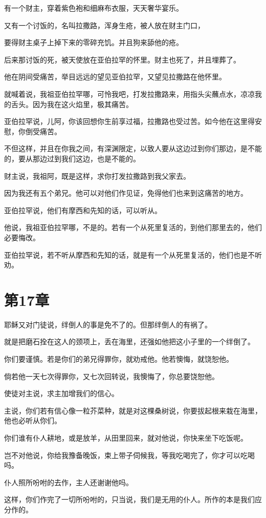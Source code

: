 \documentclass[12pt,oneside]{book}
\begin{document}
有一个财主，穿着紫色袍和细麻布衣服，天天奢华宴乐。

又有一个讨饭的，名叫拉撒路，浑身生疮，被人放在财主门口，

要得财主桌子上掉下来的零碎充饥。并且狗来舔他的疮。

后来那讨饭的死，被天使放在亚伯拉罕的怀里。财主也死了，并且埋葬了。

他在阴间受痛苦，举目远远的望见亚伯拉罕，又望见拉撒路在他怀里。

就喊着说，我祖亚伯拉罕哪，可怜我吧，打发拉撒路来，用指头尖蘸点水，凉凉我的舌头。因为我在这火焰里，极其痛苦。

亚伯拉罕说，儿阿，你该回想你生前享过福，拉撒路也受过苦。如今他在这里得安慰，你倒受痛苦。

不但这样，并且在你我之间，有深渊限定，以致人要从这边过到你们那边，是不能的，要从那边过到我们这边，也是不能的。

财主说，我祖阿，既是这样，求你打发拉撒路到我父家去。

因为我还有五个弟兄。他可以对他们作见证，免得他们也来到这痛苦的地方。

亚伯拉罕说，他们有摩西和先知的话，可以听从。

他说，我祖亚伯拉罕哪，不是的。若有一个从死里复活的，到他们那里去的，他们必要悔改。

亚伯拉罕说，若不听从摩西和先知的话，就是有一个从死里复活的，他们也是不听劝。

\chapter{第17章}
耶稣又对门徒说，绊倒人的事是免不了的。但那绊倒人的有祸了。

就是把磨石拴在这人的颈项上，丢在海里，还强如他把这小子里的一个绊倒了。

你们要谨慎。若是你们的弟兄得罪你，就劝戒他。他若懊悔，就饶恕他。

倘若他一天七次得罪你，又七次回转说，我懊悔了，你总要饶恕他。

使徒对主说，求主加增我们的信心。

主说，你们若有信心像一粒芥菜种，就是对这棵桑树说，你要拔起根来栽在海里，他也必听从你们。

你们谁有仆人耕地，或是放羊，从田里回来，就对他说，你快来坐下吃饭呢。

岂不对他说，你给我豫备晚饭，束上带子伺候我，等我吃喝完了，你才可以吃喝吗。

仆人照所吩咐的去作，主人还谢谢他吗。

这样，你们作完了一切所吩咐的，只当说，我们是无用的仆人。所作的本是我们应分作的。
\end{document}
